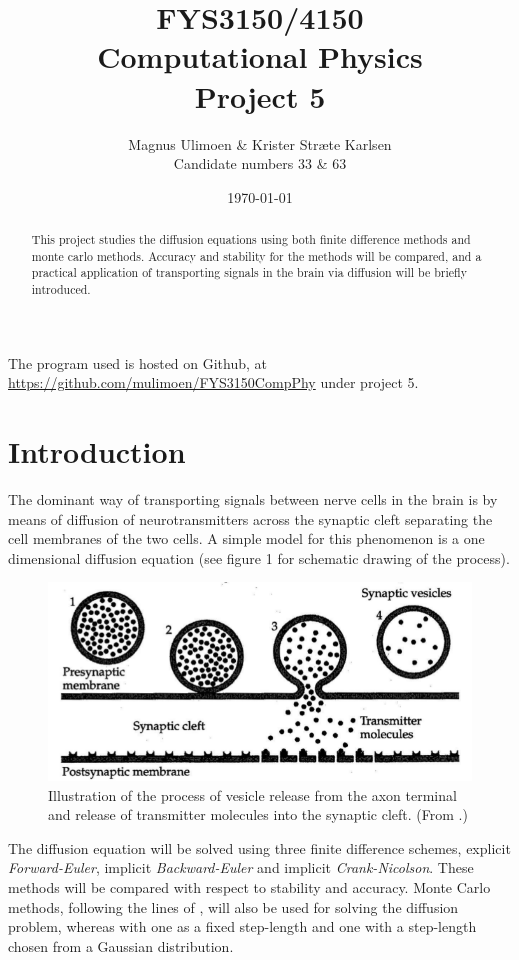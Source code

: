 \documentclass[11pt,a4paper,final]{article}
\title{FYS3150/4150\\Computational Physics\\Project 5}
\author{Magnus Ulimoen \& Krister Stræte Karlsen\\
Candidate numbers 33 \& 63}
\date{\today}
\numberwithin{equation}{section}
\begin{document}
\maketitle

\begin{abstract}
This project studies the diffusion equations using both finite difference methods and monte carlo methods. Accuracy and stability for the methods will be compared, and a practical application of transporting signals in the brain via diffusion will be briefly introduced. 
\end{abstract}

The program used is hosted on Github, at 
\url{https://github.com/mulimoen/FYS3150CompPhy} under project 5.

\section{Introduction}
The dominant way of transporting signals between nerve cells in the brain is by means of diffusion of neurotransmitters across the synaptic cleft separating the cell membranes of the two cells. A simple model for this phenomenon is a one dimensional diffusion equation (see figure 1 for schematic drawing of the process). 

\begin{figure}[H]
\centering
\includegraphics[scale=0.15]{pics/SynapticVesicle.png}
\caption{Illustration of the process of vesicle release from the axon
terminal and release of transmitter molecules into the synaptic cleft.
(From \cite{thompson2000brain}.)}
\end{figure}

The diffusion equation will be solved using three finite difference 
schemes, explicit \emph{Forward-Euler}, 
implicit \emph{Backward-Euler} and implicit \emph{Crank-Nicolson}. 
These methods will be compared with respect to stability and accuracy. 
Monte Carlo methods, following the lines of \cite{farnell2005monte},
will also be used for solving the diffusion problem, whereas with one as 
a fixed step-length and one with a step-length chosen from a Gaussian 
distribution.
\end{document}
